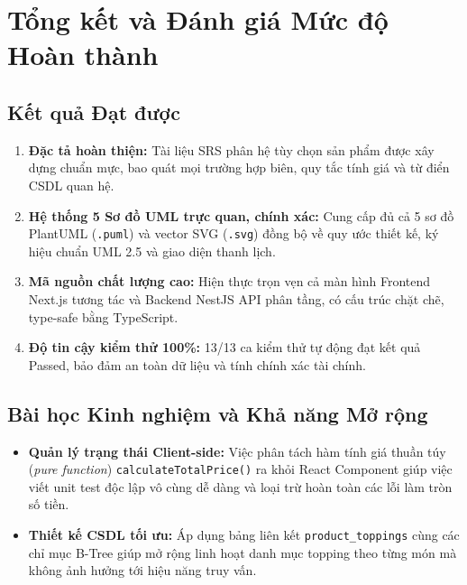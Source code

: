 \documentclass[a4paper]{article}
\begin{document}
\section{Tổng kết và Đánh giá Mức độ Hoàn thành}

\subsection{Kết quả Đạt được}
\begin{enumerate}
    \item \textbf{Đặc tả hoàn thiện:} Tài liệu SRS phân hệ tùy chọn sản phẩm được xây dựng chuẩn mực, bao quát mọi trường hợp biên, quy tắc tính giá và từ điển CSDL quan hệ.
    \item \textbf{Hệ thống 5 Sơ đồ UML trực quan, chính xác:} Cung cấp đủ cả 5 sơ đồ PlantUML (\texttt{.puml}) và vector SVG (\texttt{.svg}) đồng bộ về quy ước thiết kế, ký hiệu chuẩn UML 2.5 và giao diện thanh lịch.
    \item \textbf{Mã nguồn chất lượng cao:} Hiện thực trọn vẹn cả màn hình Frontend Next.js tương tác và Backend NestJS API phân tầng, có cấu trúc chặt chẽ, type-safe bằng TypeScript.
    \item \textbf{Độ tin cậy kiểm thử 100\%:} 13/13 ca kiểm thử tự động đạt kết quả Passed, bảo đảm an toàn dữ liệu và tính chính xác tài chính.
\end{enumerate}

\subsection{Bài học Kinh nghiệm và Khả năng Mở rộng}
\begin{itemize}
    \item \textbf{Quản lý trạng thái Client-side:} Việc phân tách hàm tính giá thuần túy (\textit{pure function}) \texttt{calculateTotalPrice()} ra khỏi React Component giúp việc viết unit test độc lập vô cùng dễ dàng và loại trừ hoàn toàn các lỗi làm tròn số tiền.
    \item \textbf{Thiết kế CSDL tối ưu:} Áp dụng bảng liên kết \texttt{product\_toppings} cùng các chỉ mục B-Tree giúp mở rộng linh hoạt danh mục topping theo từng món mà không ảnh hưởng tới hiệu năng truy vấn.
\end{itemize}
\end{document}
